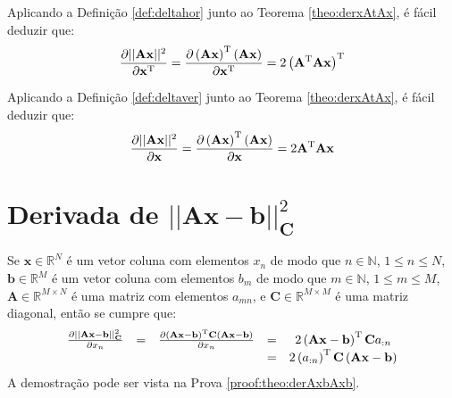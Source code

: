 \begin{corollaryT}\label{coro:derxAtAx1}
Aplicando a Definição \ref{def:deltahor} junto ao Teorema \ref{theo:derxAtAx}, é
fácil deduzir que:
\begin{equation}
\frac{\partial ||\mathbf{A}\mathbf{x}||^2 }{\partial \mathbf{x}^{\mathrm{T}}}=
\frac{\partial \left(\mathbf{A}\mathbf{x}\right)^{\mathrm{T}}\left(\mathbf{A}\mathbf{x}\right)}{\partial \mathbf{x}^{\mathrm{T}}}=
2\left(\mathbf{A}^{\mathrm{T}}\mathbf{A}\mathbf{x}\right)^{\mathrm{T}}
\end{equation}
\end{corollaryT}

\begin{corollaryT}\label{coro:derxAtAx2}
Aplicando a Definição \ref{def:deltaver} junto ao Teorema \ref{theo:derxAtAx}, é
fácil deduzir que:
\begin{equation}
\frac{\partial ||\mathbf{A}\mathbf{x}||^2 }{\partial \mathbf{x}}=
\frac{\partial \left(\mathbf{A}\mathbf{x}\right)^{\mathrm{T}}\left(\mathbf{A}\mathbf{x}\right)}{\partial \mathbf{x}}=
2 \mathbf{A}^{\mathrm{T}}\mathbf{A}\mathbf{x}
\end{equation}
\end{corollaryT}

\section{Derivada de $||\mathbf{A}\mathbf{x}-\mathbf{b}||_{\mathbf{C}}^2$ 
}

\begin{theorem}\label{theo:derAxbAxb}
Se 
$\mathbf{x}\in \mathbb{R}^N$ é um vetor coluna com elementos $x_n$ de modo que
$n\in \mathbb{N}$, $1 \leq n \leq N$, 
$\mathbf{b}\in \mathbb{R}^M$ é um vetor coluna com elementos $b_m$ de modo que
$m\in \mathbb{N}$, $1 \leq m \leq M$,  
$\mathbf{A} \in \mathbb{R}^{M\times N}$ é uma matriz com elementos $a_{mn}$, e
$\mathbf{C} \in \mathbb{R}^{M\times M}$ é uma matriz diagonal, 
então se cumpre que:
\begin{equation}
\begin{matrix}
\frac{\partial ||\mathbf{A}\mathbf{x}-\mathbf{b}||_{\mathbf{C}}^2}{\partial x_n}&=&
\frac{\partial \left(\mathbf{A}\mathbf{x}-\mathbf{b}\right)^{\mathrm{T}}\mathbf{C}\left(\mathbf{A}\mathbf{x}-\mathbf{b}\right)}{\partial x_n}&=&
2\left(\mathbf{A}\mathbf{x}-\mathbf{b}\right)^{\mathrm{T}}\mathbf{C}a_{:n}\\
~&~&~&=& 2\left(a_{:n}\right)^{\mathrm{T}}\mathbf{C}\left(\mathbf{A}\mathbf{x}-  \mathbf{b}\right)
\end{matrix}
\end{equation}
A demostração pode ser vista na Prova \ref{proof:theo:derAxbAxb}.
\end{theorem}

